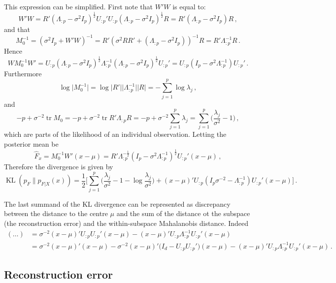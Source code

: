 \documentclass[a4paper,14pt]{article}
\begin{document}
This expression can be simplified. First note that $W'W$ is equal to:
$$W'W
    = R'(\Lambda_{:p} - \sigma^2 I_p)^\frac{1}{2} U_{:p}' U_{:p} (\Lambda_{:p} - \sigma^2 I_p)^\frac{1}{2} R
    = R'(\Lambda_{:p} - \sigma^2 I_p) R
    \,,$$
and that 
$$ M_0^{-1}
    = (\sigma^2 I_p + W'W)^{-1}
    = R' (\sigma^2 RR' + (\Lambda_{:p} - \sigma^2 I_p))^{-1} R
    = R' \Lambda_{:p}^{-1} R\,.$$
Hence
$$ W M_0^{-1} W'
    =  U_{:p} (\Lambda_{:p} - \sigma^2 I_p)^\frac{1}{2} \Lambda_{:p}^{-1}
              (\Lambda_{:p} - \sigma^2 I_p)^\frac{1}{2} U_{:p}'
    = U_{:p} (I_p - \sigma^2 \Lambda_{:p}^{-1}) U_{:p}'
    \,.$$
Furthermore 
$$\log \lvert M_0^{-1}\rvert
    = \log \lvert R'\rvert \lvert \Lambda_{:p}^{-1}\rvert \lvert R\rvert
    = - \sum_{j=1}^p \log \lambda_j\,,$$
and 
$$ - p + \sigma^{-2} \mathop{\text{tr}}\nolimits M_0
    = - p + \sigma^{-2} \mathop{\text{tr}}\nolimits R' \Lambda_{:p} R
    = - p + \sigma^{-2} \sum_{j=1}^p \lambda_j
    = \sum_{j=1}^p \biggl(\frac{\lambda_j}{\sigma^2} - 1 \biggr)\,,$$
which are parts of the likelihood of an individual observation.
Letting the posterior mean be
$$ \hat{F}_x
    = M_0^{-1} W' (x - \mu)
    = R'\Lambda_{:p}^{-\frac{1}{2}} (I_p - \sigma^2\Lambda_{:p}^{-1})^\frac{1}{2} U_{:p}' (x - \mu)
    \,,$$
Therefore the divergence is given by
$$
\mathop{\text{KL}}\nolimits(p_F\|p_{F|X}(x))
    = \frac{1}{2}\biggl[\sum_{j=1}^p \biggl(
        \frac{\lambda_j}{\sigma^2} - 1 - \log \frac{\lambda_j}{\sigma^2}
    \biggr)
    + (x-\mu)' U_{:p} (I_p\sigma^{-2} - \Lambda_{:p}^{-1}) U_{:p}'(x-\mu)\biggr]\,.
$$

The last summand of the KL divergence can be represented as discrepancy between
the distance to the centre $\mu$ and the sum of the distance ot the subspace
(the reconstruction error) and the within-subspace Mahalanobis distance. Indeed
\begin{align*}
   (\ldots)
    &= \sigma^{-2} (x-\mu)' U_{:p} U_{:p}' (x-\mu)
    - (x-\mu)' U_{:p} \Lambda_{:p}^{-1} U_{:p}'(x-\mu)\\
    &= \sigma^{-2} (x-\mu)' (x-\mu)
    - \sigma^{-2} (x-\mu)' \bigl(I_d - U_{:p} U_{:p}' \bigr)(x-\mu)
    - (x-\mu)' U_{:p} \Lambda_{:p}^{-1} U_{:p}'(x-\mu)\,.
\end{align*}


\subsection{Reconstruction error} %
\label{sub:reconstruction_error}
\end{document}
